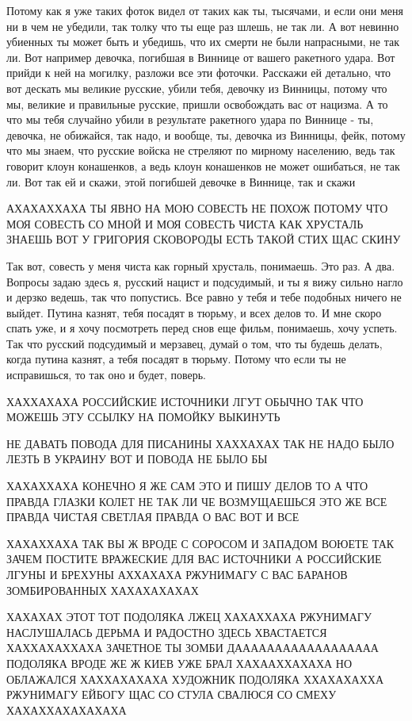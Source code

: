 Потому как я уже таких фоток видел от таких как ты, тысячами, и если они меня ни
в чем не убедили, так толку что ты еще раз шлешь, не так ли. А вот невинно
убиенных ты может быть и убедишь, что их смерти не были напрасными, не так ли.
Вот например девочка, погибшая в Виннице от вашего ракетного удара. Вот прийди
к ней на могилку, разложи все эти фоточки. Расскажи ей детально, что вот
дескать мы великие русские, убили тебя, девочку из Винницы, потому что мы,
великие и правильные русские, пришли освобождать вас от нацизма. А то что мы
тебя случайно убили в результате ракетного удара по Виннице - ты, девочка, не
обижайся, так надо, и вообще, ты, девочка из Винницы, фейк, потому что мы
знаем, что русские войска не стреляют по мирному населению, ведь так говорит
клоун конашенков, а ведь клоун конашенков не может ошибаться, не так ли. Вот
так ей и скажи, этой погибшей девочке в Виннице, так и скажи

АХАХАХХАХА ТЫ ЯВНО НА МОЮ СОВЕСТЬ НЕ ПОХОЖ ПОТОМУ ЧТО МОЯ СОВЕСТЬ СО МНОЙ И МОЯ
СОВЕСТЬ ЧИСТА КАК ХРУСТАЛЬ ЗНАЕШЬ ВОТ У ГРИГОРИЯ СКОВОРОДЫ ЕСТЬ ТАКОЙ СТИХ ЩАС
СКИНУ

Так вот, совесть у меня чиста как горный хрусталь, понимаешь. Это раз. А два.
Вопросы задаю здесь я, русский нацист и подсудимый, и ты я вижу сильно нагло и
дерзко ведешь, так что попустись. Все равно у тебя и тебе подобных ничего не
выйдет. Путина казнят, тебя посадят в тюрьму, и всех делов то. И мне скоро
спать уже, и я хочу посмотреть перед снов еще фильм, понимаешь, хочу успеть.
Так что русский подсудимый и мерзавец, думай о том, что ты будешь делать, когда
путина казнят, а тебя посадят в тюрьму. Потому что если ты не исправишься, то
так оно и будет, поверь.

ХАХХАХАХА РОССИЙСКИЕ ИСТОЧНИКИ ЛГУТ ОБЫЧНО ТАК ЧТО МОЖЕШЬ ЭТУ ССЫЛКУ НА ПОМОЙКУ
ВЫКИНУТЬ

НЕ ДАВАТЬ ПОВОДА ДЛЯ ПИСАНИНЫ ХАХХАХАХ ТАК НЕ НАДО БЫЛО ЛЕЗТЬ В УКРАИНУ ВОТ И
ПОВОДА НЕ БЫЛО БЫ

ХАХАХХАХА КОНЕЧНО Я ЖЕ САМ ЭТО И ПИШУ ДЕЛОВ ТО А ЧТО ПРАВДА ГЛАЗКИ КОЛЕТ НЕ ТАК
ЛИ ЧЕ ВОЗМУЩАЕШЬСЯ ЭТО ЖЕ ВСЕ ПРАВДА ЧИСТАЯ СВЕТЛАЯ ПРАВДА О ВАС ВОТ И ВСЕ

ХАХАХХАХА ТАК ВЫ Ж ВРОДЕ С СОРОСОМ И ЗАПАДОМ ВОЮЕТЕ ТАК ЗАЧЕМ ПОСТИТЕ ВРАЖЕСКИЕ
ДЛЯ ВАС ИСТОЧНИКИ А РОССИЙСКИЕ ЛГУНЫ И БРЕХУНЫ АХХАХАХА РЖУНИМАГУ С ВАС БАРАНОВ
ЗОМБИРОВАННЫХ ХАХАХАХАХАХ

ХАХАХАХ ЭТОТ ТОТ ПОДОЛЯКА ЛЖЕЦ ХАХАХХАХА РЖУНИМАГУ НАСЛУШАЛАСЬ ДЕРЬМА И
РАДОСТНО ЗДЕСЬ ХВАСТАЕТСЯ ХАХХАХАХХАХА ЗАЧЕТНОЕ ТЫ ЗОМБИ ДАААААААААААААААААА
ПОДОЛЯКА ВРОДЕ ЖЕ Ж КИЕВ УЖЕ БРАЛ ХАХААХХАХАХА НО ОБЛАЖАЛСЯ ХАХХАХАХАХА
ХУДОЖНИК ПОДОЛЯКА ХХАХАХАХХА РЖУНИМАГУ ЕЙБОГУ ЩАС СО СТУЛА СВАЛЮСЯ СО СМЕХУ
ХАХАХХАХАХАХАХА

